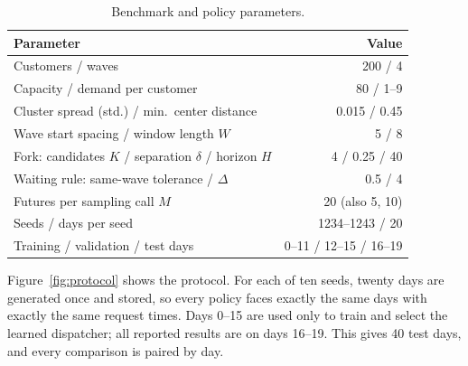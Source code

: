 \documentclass[5p,times,authoryear]{elsarticle}
\begin{document}
\begin{table}[t]
\centering
\caption{Benchmark and policy parameters.}
\label{tab:params}
\footnotesize
\setlength{\tabcolsep}{4pt}
\begin{tabular}{@{}lr@{}}
\toprule
Parameter & Value \\
\midrule
Customers / waves & 200 / 4 \\
Capacity / demand per customer & 80 / 1--9 \\
Cluster spread (std.) / min.\ center distance & 0.015 / 0.45 \\
Wave start spacing / window length $W$ & 5 / 8 \\
Fork: candidates $K$ / separation $\delta$ / horizon $H$ & 4 / 0.25 / 40 \\
Waiting rule: same-wave tolerance / $\Delta$ & 0.5 / 4 \\
Futures per sampling call $M$ & 20 (also 5, 10) \\
Seeds / days per seed & 1234--1243 / 20 \\
Training / validation / test days & 0--11 / 12--15 / 16--19 \\
\bottomrule
\end{tabular}
\end{table}

Figure~\ref{fig:protocol} shows the protocol. For each of ten seeds, twenty days are generated once and stored, so every policy faces exactly the same days with exactly the same request times. Days 0--15 are used only to train and select the learned dispatcher; all reported results are on days 16--19. This gives 40 test days, and every comparison is paired by day.
\end{document}
